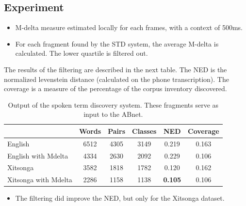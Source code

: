 \documentclass[final]{beamer}
\newcommand{\abnet}{{\sc ABnet}}
\begin{document}
\begin{frame}[t]
\begin{multicols}{3}
\subsection{Experiment}
\begin{itemize}
\item M-delta measure estimated locally for each frames, with a context of 500ms.
\item For each fragment found by the STD system, the average M-delta is calculated. The lower quartile is filtered out.
\end{itemize}
The results of the filtering are described in the next table. The NED is the normalized levenstein distance (calculated on the phone transcription). The coverage is a measure of the percentage of the corpus inventory discovered.

\begin{table}[h]
\caption{\label{tab:std-stats} Output of the spoken term discovery system. These fragments serve as input to the \abnet{}.}
\small
\begin{tabular}{lccccc}
\hline
         & Words & Pairs & Classes & NED   & Coverage \\
\hline
English & 6512 & 4305 & 3149 & 0.219 & 0.163 \\
English with Mdelta & 4334 & 2630 & 2092 & 0.229 & 0.106 \\
\hline
Xitsonga & 3582 & 1818 & 1782 & 0.120 & 0.162 \\
Xitsonga with Mdelta & 2286 & 1158 & 1138 &  \textbf{0.105} & 0.106 \\
\hline
\end{tabular}
\end{table}

\begin{itemize}
\item The filtering did improve the NED, but only for the Xitsonga dataset.
\end{itemize}






\end{multicols}
\end{frame}
\end{document}
